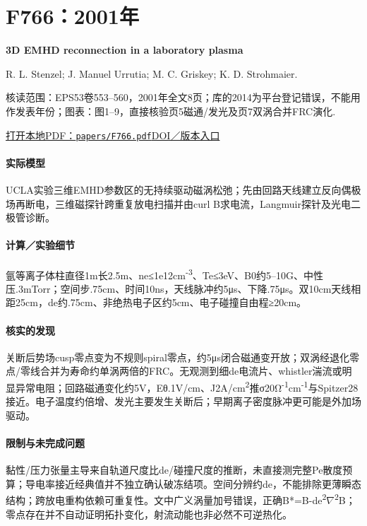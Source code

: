 \section{F766：2001年}\label{paper:F766}

\textbf{3D EMHD reconnection in a laboratory plasma}\citep{F766}\

R. L. Stenzel;  J. Manuel Urrutia;  M. C. Griskey;  K. D. Strohmaier.

\textsf{核读范围：}EPS53卷553–560，2001年全文8页；库的2014为平台登记错误，不能用作发表年份；\textsf{图表：}图1–9，直接核验页5磁通/发光及页7双涡合并FRC演化.

\href{run:papers/F766.pdf}{打开本地PDF：\texttt{papers/F766.pdf}}\quad\href{https://doi.org/10.1186/bf03353269}{DOI／版本入口}

\paragraph{实际模型}UCLA实验三维EMHD参数区的无持续驱动磁涡松弛；先由回路天线建立反向偶极场再断电，三维磁探针跨重复放电扫描并由curl B求电流，Langmuir探针及光电二极管诊断。

\paragraph{计算／实验细节}氩等离子体柱直径1m长2.5m、ne≤1e12cm\textsuperscript{-3}、Te≤3eV、B0约5–10G、中性压.3mTorr；空间步.75cm、时间10ns，天线脉冲约5μs、下降.75μs。双10cm天线相距25cm，de约.75cm、非绝热电子区约5cm、电子碰撞自由程≥20cm。

\paragraph{核实的发现}关断后势场cusp零点变为不规则spiral零点，约5μs闭合磁通变开放；双涡经退化零点/零线合并为寿命约单涡两倍的FRC。无观测到细de电流片、whistler湍流或明显异常电阻；回路磁通变化约5V，Eθ.1V/cm、J2A/cm\textsuperscript{2}推σ20Ω\textsuperscript{-1}cm\textsuperscript{-1}与Spitzer28接近。电子温度约倍增、发光主要发生关断后；早期离子密度脉冲更可能是外加场驱动。

\paragraph{限制与未完成问题}黏性/压力张量主导来自轨道尺度比de/碰撞尺度的推断，未直接测完整Pe散度预算；导电率接近经典值并不独立确认破冻结项。空间分辨约de，不能排除更薄瞬态结构；跨放电重构依赖可重复性。文中广义涡量加号错误，正确B*=B-de\textsuperscript{2}\ensuremath{\nabla}\textsuperscript{2}B；零点存在并不自动证明拓扑变化，射流动能也非必然不可逆热化。

